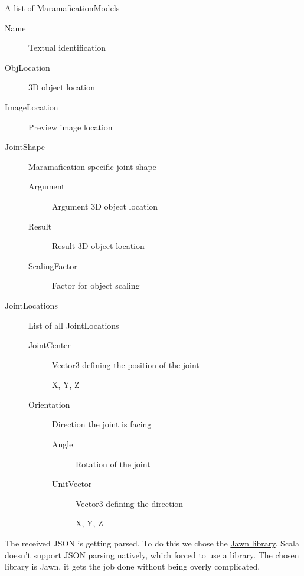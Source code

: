 \documentclass[10pt]{extarticle} %
\begin{document}
    \begin{description}
        \item[MaramaficationModels] A list of MaramaficationModels
        \begin{description}
            \item[Name] Textual identification
            \item[ObjLocation] 3D object location
            \item[ImageLocation] Preview image location
            \item[JointShape] Maramafication specific joint shape
            \begin{description}
                \item[Argument] Argument 3D object location
                \item[Result] Result 3D object location
                \item[ScalingFactor] Factor for object scaling
            \end{description}
            \item[JointLocations] List of all JointLocations
            \begin{description}
                \item[JointCenter] Vector3 defining the position of the joint
                \begin{description}
                    \item[X, Y, Z]
                \end{description}
                \item[Orientation] Direction the joint is facing
                \begin{description}
                    \item[Angle] Rotation of the joint
                    \item[UnitVector] Vector3 defining the direction
                    \begin{description}
                        \item[X, Y, Z]
                    \end{description}
                \end{description}
            \end{description}
        \end{description}
        \item
    \end{description}

    The received JSON is getting parsed.
    To do this we chose the \href{https://github.com/non/jawn}{Jawn library}.
    Scala doesn't support JSON parsing natively, which forced to use a library.
    The chosen library is Jawn, it gets the job done without being overly complicated.
\end{document}
